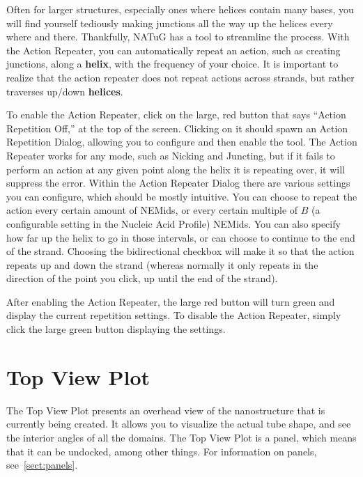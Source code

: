 \documentclass[titlepage]{article}
\begin{document}
Often for larger structures, especially ones where helices contain many bases, you will find yourself tediously making junctions all the way up the helices every where and there. Thankfully, NATuG has a tool to streamline the process. With the Action Repeater, you can automatically repeat an action, such as creating junctions, along a \textbf{helix}, with the frequency of your choice. It is important to realize that the action repeater does not repeat actions across strands, but rather traverses up/down \textbf{helices}.

To enable the Action Repeater, click on the large, red button that says ``Action Repetition Off,'' at the top of the screen. Clicking on it should spawn an Action Repetition Dialog, allowing you to configure and then enable the tool. The Action Repeater works for any mode, such as Nicking and Juncting, but if it fails to perform an action at any given point along the helix it is repeating over, it will suppress the error. Within the Action Repeater Dialog there are various settings you can configure, which should be mostly intuitive. You can choose to repeat the action every certain amount of NEMids, or every certain multiple of $B$ (a configurable setting in the Nucleic Acid Profile) NEMids. You can also specify how far up the helix to go in those intervals, or can choose to continue to the end of the strand. Choosing the bidirectional checkbox will make it so that the action repeats up and down the strand (whereas normally it only repeats in the direction of the point you click, up until the end of the strand).

After enabling the Action Repeater, the large red button will turn green and display the current repetition settings. To disable the Action Repeater, simply click the large green button displaying the settings.

\section{Top View Plot}

The Top View Plot presents an overhead view of the nanostructure that is currently being created. It allows you to visualize the actual tube shape, and see the interior angles of all the domains. The Top View Plot is a panel, which means that it can be undocked, among other things. For information on panels, see~\ref{sect:panels}.
\end{document}
